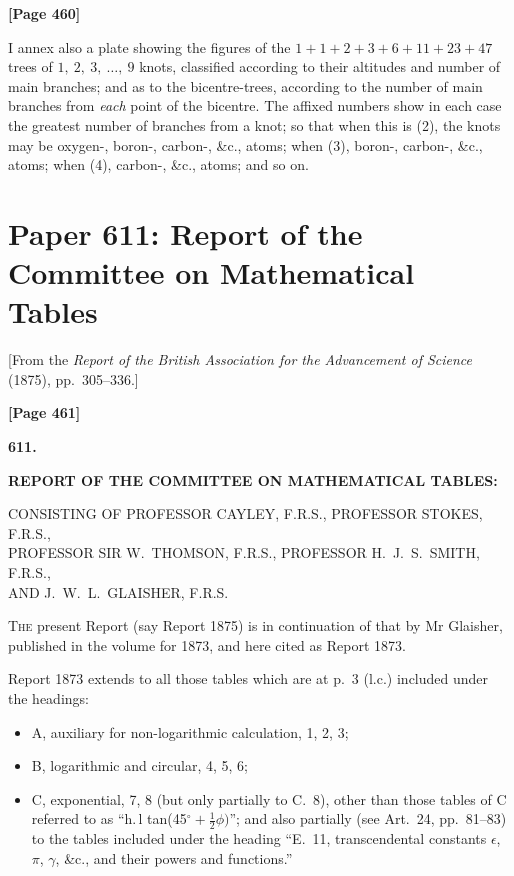 \documentclass[11pt,a4paper]{book}
\begin{document}
\newpage
\textbf{[Page 460]}

I annex also a plate showing the figures of the $1 + 1 + 2 + 3 + 6 + 11 + 23 + 47$ trees of $1,\ 2,\ 3,\ \ldots,\ 9$ knots, classified according to their altitudes and number of main branches; and as to the bicentre-trees, according to the number of main branches from \textit{each} point of the bicentre. The affixed numbers show in each case the greatest number of branches from a knot; so that when this is (2), the knots may be oxygen-, boron-, carbon-, \&c., atoms; when (3), boron-, carbon-, \&c., atoms; when (4), carbon-, \&c., atoms; and so on.

\newpage
\section{Paper 611: Report of the Committee on Mathematical Tables}

\begin{center}
{\small[From the \textit{Report of the British Association for the Advancement of Science} (1875), pp.\ 305--336.]}
\end{center}

\textbf{[Page 461]}

\begin{center}
\textbf{611.}

\textbf{REPORT OF THE COMMITTEE ON MATHEMATICAL TABLES:}

\small
CONSISTING OF PROFESSOR CAYLEY, F.R.S., PROFESSOR STOKES, F.R.S.,\\
PROFESSOR SIR W.\ THOMSON, F.R.S., PROFESSOR H.\ J.\ S.\ SMITH, F.R.S.,\\
AND J.\ W.\ L.\ GLAISHER, F.R.S.
\end{center}

\normalsize
\textsc{The} present Report (say Report 1875) is in continuation of that by Mr Glaisher, published in the volume for 1873, and here cited as Report 1873.

Report 1873 extends to all those tables which are at p.\ 3 (l.c.) included under the headings:
\begin{itemize}[nosep]
\item A, auxiliary for non-logarithmic calculation, 1, 2, 3;
\item B, logarithmic and circular, 4, 5, 6;
\item C, exponential, 7, 8 (but only partially to C.\ 8), other than those tables of C referred to as ``h.\,l tan(45$^{\circ} + \frac{1}{2}\phi)$''; and also partially (see Art.\ 24, pp.\ 81--83) to the tables included under the heading ``E.\ 11, transcendental constants $\epsilon$, $\pi$, $\gamma$, \&c., and their powers and functions.''
\end{itemize}
\end{document}
